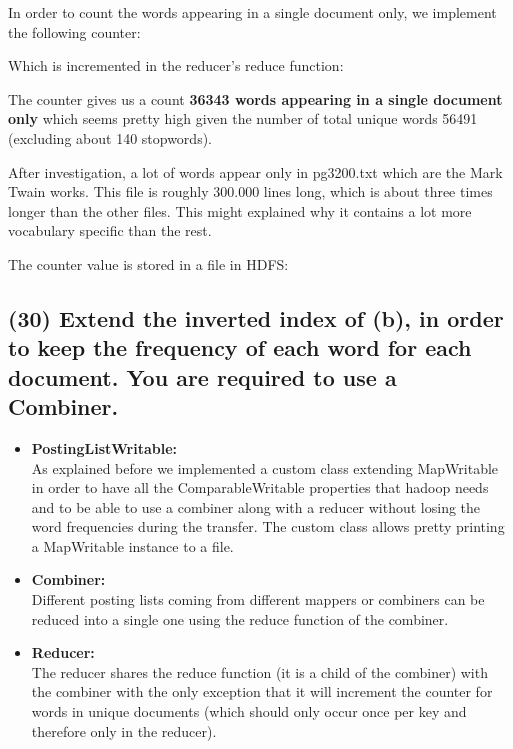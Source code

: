 \documentclass[a4paper,10pt]{article}
\begin{document}
In order to count the words appearing in a single document only, we implement the following counter:

Which is incremented in the reducer's reduce function:


The counter gives us a count \textbf{36343 words appearing in a single document only}
which seems pretty high given the number of total unique words 56491
(excluding about 140 stopwords).

After investigation, a lot of words appear only in pg3200.txt which are the Mark Twain works.
This file is roughly 300.000 lines long, which is about three times longer than the other files.
This might explained why it contains a lot more vocabulary specific than the rest.

The counter value is stored in a file in HDFS:


\subsection{(30) Extend the inverted index of (b), in order to keep the frequency of each word for
each document. You are required to use a Combiner.}
\begin{itemize}
  \item \textbf{PostingListWritable:}\\
  As explained before we implemented a custom class extending MapWritable in order to have
  all the ComparableWritable properties that hadoop needs and to be able to use a
  combiner along with a reducer without losing the word frequencies during the transfer.
  The custom class allows pretty printing a MapWritable instance to a file.
  
  \item \textbf{Combiner:}\\
  Different posting lists coming from different mappers or combiners can be reduced
  into a single one using the reduce function of the combiner.
  
  \item \textbf{Reducer:}\\
  The reducer shares the reduce function (it is a child of the combiner) with the combiner with the only exception
  that it will increment the counter for words in unique documents (which should only occur
  once per key and therefore only in the reducer).
  
\end{itemize}
\end{document}
